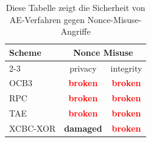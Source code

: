 \begin{table}[h]
  \centering
\begin{tabular}{l c c}
    \textbf{Scheme} & \multicolumn{2}{c}{\textbf{Nonce Misuse}}\\
    \cmidrule{2-3} &   privacy & integrity\\
  \midrule
  OCB3  & \textcolor{red}{\textbf{broken}} & \textcolor{red}{\textbf{broken}}\\
  RPC   & \textcolor{red}{\textbf{broken}} & \textcolor{red}{\textbf{broken}}\\
  TAE   & \textcolor{red}{\textbf{broken}} & \textcolor{red}{\textbf{broken}}\\
  XCBC-XOR & \textbf{damaged}   & \textcolor{red}{\textbf{broken}}\\
\end{tabular}
\caption{Diese Tabelle zeigt die Sicherheit von AE-Verfahren gegen Nonce-Misuse-Angriffe}\label{tab:foo:bar}
\end{table}
  